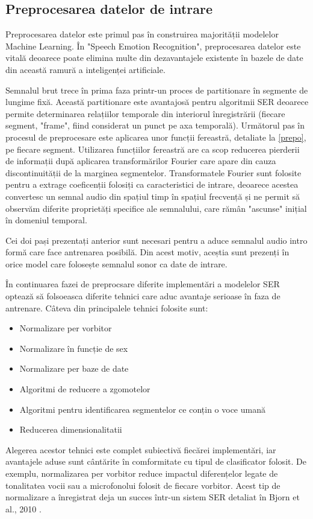 \documentclass[a4paper,12pt]{book}
\begin{document}
					\subsection{Preprocesarea datelor de intrare}
						Preprocesarea datelor este primul pas în construirea majorității modelelor Machine Learning. În "Speech Emotion Recognition", preprocesarea datelor este vitală deoarece poate elimina multe din dezavantajele existente în bazele de date din această ramură a inteligenței artificiale.\par
						Semnalul brut trece în prima faza printr-un proces de partitionare în segmente de lungime fixă. Această partitionare este avantajosă pentru algoritmii SER deoarece permite determinarea relațiilor temporale din interiorul înregistrării (fiecare segment, "frame", fiind considerat un punct pe axa temporală). Următorul pas în procesul de preprocesare este aplicarea unor funcții fereastră, detaliate la \ref{prepo}, pe fiecare segment. Utilizarea funcțiilor fereastră are ca scop reducerea pierderii de informații după aplicarea transformărilor Fourier care apare din cauza discontinuității de la marginea segmentelor.
						Transformatele Fourier sunt folosite pentru a extrage coeficenții folosiți ca caracteristici de intrare, deoarece acestea convertesc un semnal audio din spațiul timp în spațiul frecvență și ne permit să observăm diferite proprietăți specifice ale semnalului, care rămân "ascunse" inițial în domeniul temporal. \par
						Cei doi pași prezentați anterior sunt necesari pentru a aduce semnalul audio intro formă care face antrenarea posibilă. Din acest motiv, aceștia sunt prezenți în orice model care folosește semnalul sonor ca date de intrare. \par
						În continuarea fazei de preprocsare diferite implementări a modelelor SER optează să folsoeasca diferite tehnici care aduc avantaje serioase în faza de antrenare. Câteva din principalele tehnici folosite sunt:
						\begin{itemize}
							\setlength\itemsep{0pt}
							\setlength{\itemindent}{1.5cm}
							\item Normalizare per vorbitor
							\item Normalizare în funcție de sex
							\item Normalizare per baze de date
							\item Algoritmi de reducere a zgomotelor
							\item Algoritmi pentru identificarea segmentelor ce conțin o voce umană
							\item Reducerea dimensionalitatii
						\end{itemize}	
						Alegerea acestor tehnici este complet subiectivă fiecărei implementări, iar avantajele aduse sunt cântărite în comformitate cu tipul de clasificator folosit. De exemplu, normalizarea per vorbitor reduce impactul diferențelor legate de tonalitatea vocii sau a microfonolui folosit de fiecare vorbitor. Acest tip de normalizare a înregistrat deja un succes într-un sistem SER detaliat în Bjorn et al., 2010 \cite{spnorm}.
\end{document}

